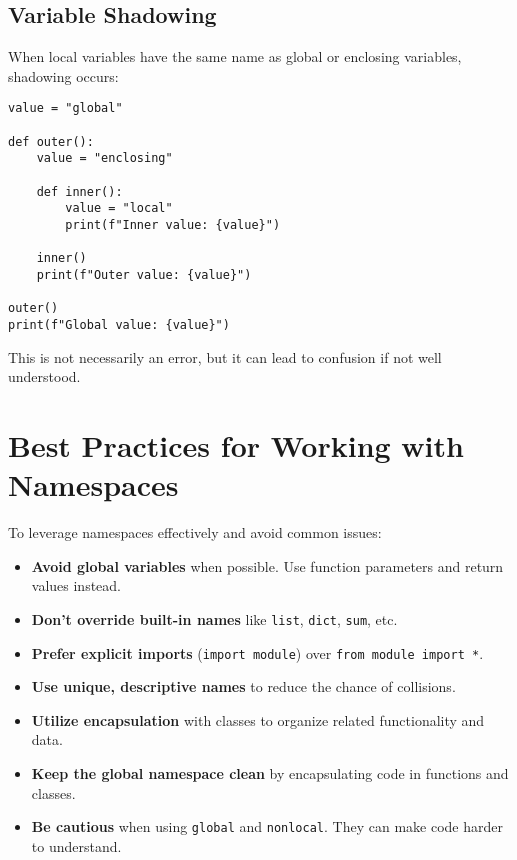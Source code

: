 \documentclass[12pt,letterpaper]{article}
\newenvironment{macterminal}{%
    \begin{mdframed}[
        linecolor=terminalFrame,
        backgroundcolor=terminalBg,
        roundcorner=5pt,
        skipabove=10pt,
        skipbelow=10pt,
        linewidth=1pt,
        innertopmargin=10pt, %
        frametitle={%
            \tikz[baseline=(current bounding box.east), outer sep=0pt]{
                \fill[red!80!black] (0,0) circle (5pt);
                \fill[yellow!80!black] (0.7,0) circle (5pt);
                \fill[green!70!black] (1.4,0) circle (5pt);
            }
        },
        frametitlealignment=\raggedright, %
        frametitleaboveskip=8pt, %
        frametitlebelowskip=0pt, %
    ]
}{%
    \end{mdframed}%
}
\begin{document}
\subsection{Variable Shadowing}

When local variables have the same name as global or enclosing variables, shadowing occurs:

\begin{macterminal}
\begin{lstlisting}
value = "global"

def outer():
    value = "enclosing"
    
    def inner():
        value = "local"
        print(f"Inner value: {value}")
    
    inner()
    print(f"Outer value: {value}")

outer()
print(f"Global value: {value}")
\end{lstlisting}
\end{macterminal}

This is not necessarily an error, but it can lead to confusion if not well understood.

\section{Best Practices for Working with Namespaces}

To leverage namespaces effectively and avoid common issues:

\begin{itemize}
    \item \textbf{\textcolor{pythonBlue}{Avoid global variables}} when possible. Use function parameters and return values instead.
    \item \textbf{\textcolor{pythonBlue}{Don't override built-in names}} like \texttt{list}, \texttt{dict}, \texttt{sum}, etc.
    \item \textbf{\textcolor{pythonBlue}{Prefer explicit imports}} (\texttt{import module}) over \texttt{from module import *}.
    \item \textbf{\textcolor{pythonBlue}{Use unique, descriptive names}} to reduce the chance of collisions.
    \item \textbf{\textcolor{pythonBlue}{Utilize encapsulation}} with classes to organize related functionality and data.
    \item \textbf{\textcolor{pythonBlue}{Keep the global namespace clean}} by encapsulating code in functions and classes.
    \item \textbf{\textcolor{pythonBlue}{Be cautious}} when using \texttt{global} and \texttt{nonlocal}. They can make code harder to understand.
\end{itemize}
\end{document}
